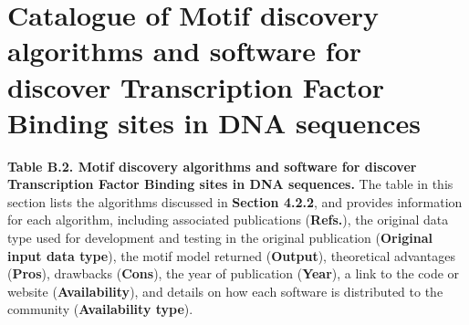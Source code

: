 \documentclass[a4paper, titlepage, openright]{book}
\begin{document}
\section{Catalogue of Motif discovery algorithms and software for discover Transcription Factor Binding sites in DNA sequences}\label{section:algorithms-table-appendix}
\textbf{Table B.2. Motif discovery algorithms and software for discover Transcription Factor Binding sites in DNA sequences.} The table in this section lists the algorithms discussed in \textbf{Section 4.2.2}, and provides information for each algorithm, including associated publications (\textbf{Refs.}), the original data type used for development and testing in the original publication (\textbf{Original input data type}), the motif model returned (\textbf{Output}), theoretical advantages (\textbf{Pros}), drawbacks (\textbf{Cons}), the year of publication (\textbf{Year}), a link to the code or website (\textbf{Availability}), and details on how each software is distributed to the community (\textbf{Availability type}).
\end{document}
